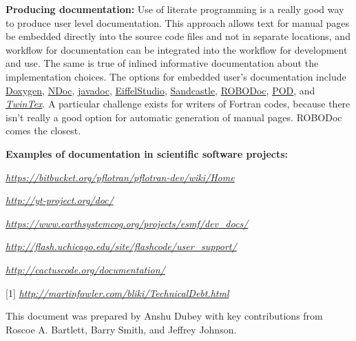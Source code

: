 \documentclass[]{article}
\begin{document}
\textbf{Producing documentation:} Use of
literate programming is a really good way to produce user level
documentation. This approach allows text for manual pages be embedded
directly into the source code files and not in separate locations, and
workflow for documentation can be integrated into the workflow for
development and use. The same is true of inlined informative
documentation about the implementation choices. The options for embedded
user's documentation include
\href{https://en.wikipedia.org/wiki/Doxygen}{Doxygen},
\href{https://en.wikipedia.org/wiki/NDoc}{NDoc},
\href{https://en.wikipedia.org/wiki/Javadoc}{javadoc},
\href{https://en.wikipedia.org/wiki/EiffelStudio}{EiffelStudio},
\href{https://en.wikipedia.org/wiki/Sandcastle_(software)}{Sandcastle},
\href{https://en.wikipedia.org/wiki/ROBODoc}{ROBODoc},
\href{https://en.wikipedia.org/wiki/Plain_Old_Documentation}{POD}, and
\href{https://en.wikipedia.org/wiki/TwinText}{\emph{TwinTex}}. A
particular challenge exists for writers of Fortran codes, because there
isn't really a good option for automatic generation of manual pages.
ROBODoc comes the closest.


\textbf{Examples of documentation in
scientific software
projects:}

\href{https://bitbucket.org/pflotran/pflotran-dev/wiki/Home}{\emph{https://bitbucket.org/pflotran/pflotran-dev/wiki/Home}}

\href{http://yt-project.org/doc/}{\emph{http://yt-project.org/doc/}}

\href{https://www.earthsystemcog.org/projects/esmf/dev_docs/}{\emph{https://www.earthsystemcog.org/projects/esmf/dev\_docs/}}

\href{http://flash.uchicago.edu/site/flashcode/user_support/}{\emph{http://flash.uchicago.edu/site/flashcode/user\_support/}}

\href{http://cactuscode.org/documentation/}{\emph{http://cactuscode.org/documentation/}}

{[}1{]}
\href{http://martinfowler.com/bliki/TechnicalDebt.html}{\emph{http://martinfowler.com/bliki/TechnicalDebt.html}}

This document was prepared by Anshu Dubey with key contributions from
Roscoe A. Bartlett, Barry Smith, and Jeffrey Johnson.
\end{document}
